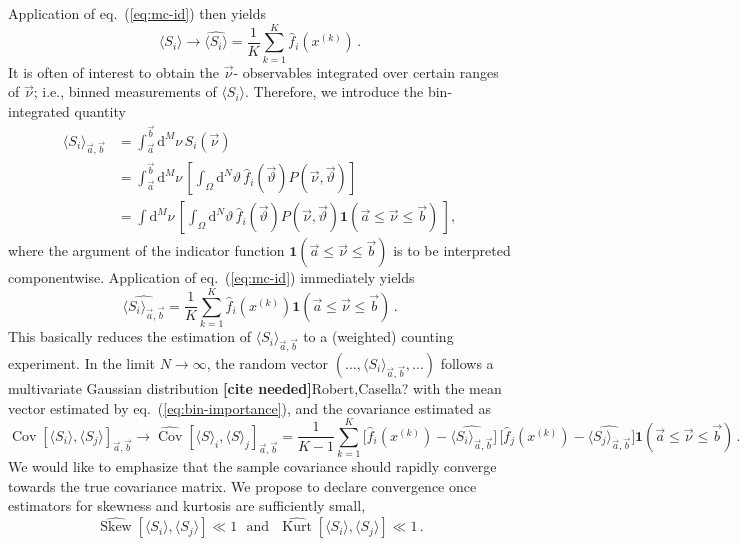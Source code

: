 \documentclass[aps,prd,reprint,nofootinbib,preprintnumbers]{revtex4}
\newcommand{\rmdx}[1]{\mbox{d} #1 \,} %
\newcommand{\refeq}[1]{eq.~(\ref{eq:#1})}
\newcommand{\nuvec}{\vec{\nu}}
\newcommand{\thvec}{\vec{\vartheta}}
\renewcommand{\theta}{\vartheta}
\newcommand{\aver}[1]{\langle #1 \rangle}
\newcommand{\est}[1]{\widehat{#1}}
\DeclareMathOperator{\cov}{Cov}
\DeclareMathOperator{\kurt}{Kurt}
\newcommand{\fred}[1]{{\color{brown!85!black}#1}}
\newcommand{\citeneeded}{{\color{red}\bf [cite needed]}}
\begin{document}
Application of \refeq{mc-id} then yields
\begin{equation}
    \langle S_i\rangle \to \widehat{\langle S_i\rangle} = \frac{1}{K} \sum_{k=1}^{K} \hat{f}_i(x^{(k)})\,.
\end{equation}
It is often of interest to obtain the $\nuvec$- observables integrated
over certain ranges of $\nuvec$; i.e., binned measurements of $\langle
S_i\rangle$.
Therefore, we introduce the bin-integrated quantity
\begin{align}
    \langle S_i\rangle_{\vec{a},\vec{b}}
    & = \int_{\vec{a}}^{\vec{b}} \rmdx{^M \nu} S_i(\nuvec)\\
    & = \int_{\vec{a}}^{\vec{b}} \rmdx{^M \nu} \left[\int_{\Omega} \rmdx{^N\theta} \hat{f}_i(\thvec) P(\nuvec,\thvec)  \right]\\
    & = \int \rmdx{^M \nu} \left[\int_{\Omega} \rmdx{^N\theta} \hat{f}_i(\thvec) P(\nuvec,\thvec)
        \mathbf{1}(\vec{a} \le \nuvec \le \vec{b})\,
        \right],
\end{align}
where the argument of the indicator function $ \mathbf{1}(\vec{a} \le
\nuvec \le \vec{b})$ is to be interpreted componentwise.
Application of \refeq{mc-id} immediately yields
\begin{equation}
    \label{eq:bin-importance}
    \widehat{\langle S_i\rangle_{\vec{a},\vec{b}}}
    = \frac{1}{K} \sum_{k=1}^{K} \hat{f}_i(x^{(k)})         \mathbf{1}(\vec{a} \le \nuvec \le \vec{b})\,.
\end{equation}
This basically reduces the estimation of
$\aver{S_i}_{\vec{a},\vec{b}}$ to a (weighted) counting experiment. In
the limit $N \to \infty$, the random vector $( \dots,
\aver{S_i}_{\vec{a},\vec{b}}, \dots)$ follows a multivariate Gaussian
distribution \citeneeded\fred{Robert,Casella?}
with the mean vector estimated by \refeq{bin-importance}, and the covariance
estimated as
\begin{equation}
    \cov[\aver{S_i},\aver{S_j}]_{\vec{a},\vec{b}} \to \est{\cov}[\aver{S}_i, \aver{S}_j]_{\vec{a},\vec{b}}
        = \frac{1}{K - 1} \sum_{k=1}^{K} \big[\hat{f}_i(x^{(k)}) - \est{\langle S_i\rangle_{\vec{a},\vec{b}}}\big]\,\big[\hat{f}_j(x^{(k)}) - \widehat{\langle S_j\rangle_{\vec{a},\vec{b}}}\big]
        \mathbf{1}(\vec{a} \le \nuvec \le \vec{b})\,.
\end{equation}
We would like to emphasize that the sample covariance should rapidly converge towards the true covariance matrix.
We propose to declare convergence once estimators for skewness and kurtosis are sufficiently small,
\begin{equation}
    \est{\operatorname{Skew}}[\aver{S_i},\aver{S_j}] \ll 1\,\,\text{ and }\,\,\est{\kurt}[\aver{S_i},\aver{S_j}] \ll 1\,.
\end{equation}
\end{document}
